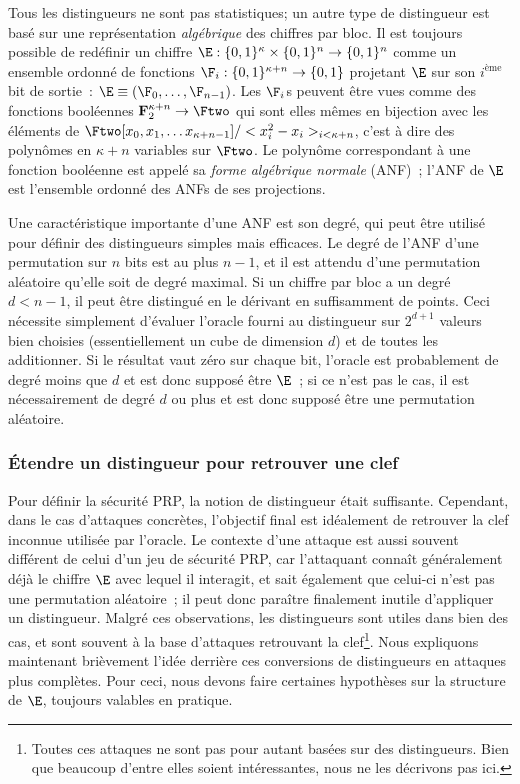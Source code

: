 \bigskip

Tous les distingueurs ne sont pas statistiques;
un autre type de distingueur est basé sur une représentation \emph{algébrique} des chiffres par bloc.
Il est toujours possible de redéfinir un chiffre 
$\E : \{0,1\}^\kappa \times \{0,1\}^n \rightarrow \{0,1\}^n$ comme un ensemble ordonné de fonctions $\F_i : \{0,1\}^{\kappa+n} \rightarrow \{0,1\}$ projetant
$\E$ sur son $i^\text{ème}$ bit de sortie~: $\E \equiv (\F_0, \ldots, \F_{n-1})$. Les $\F_i$s peuvent être vues comme des fonctions booléennes
$\mathbf{F}_{2}^{\kappa + n} \rightarrow \Ftwo$ qui sont elles mêmes en bijection avec les éléments de $\Ftwo[x_0,x_1,\ldots x_{\kappa + n-1}]/<x_i^2-x_i>_{i<\kappa + n}$,
c'est à dire des polynômes en $\kappa + n$ variables sur $\Ftwo$. Le polynôme correspondant à une fonction booléenne est appelé sa \emph{forme algébrique normale}
(ANF)~;
l'ANF de $\E$ est l'ensemble ordonné des ANFs de ses projections.

Une caractéristique importante d'une ANF est son degré, qui peut être utilisé pour définir des distingueurs simples mais efficaces.
Le degré de l'ANF d'une permutation sur $n$ bits est au plus $n - 1$, et il est attendu d'une permutation aléatoire qu'elle soit de degré
maximal. Si un chiffre par bloc a un degré $d < n - 1$, il peut être distingué en le dérivant en suffisamment de points.
Ceci nécessite simplement d'évaluer l'oracle fourni au distingueur sur $2^{d+1}$ valeurs bien choisies (essentiellement un cube de dimension $d$) et de toutes
les additionner.
Si le résultat vaut zéro sur chaque bit, l'oracle est probablement de degré moins que $d$ et est donc supposé être $\E$~; si ce n'est pas le cas, il est
nécessairement de degré $d$ ou plus et est donc supposé être une permutation aléatoire.

\subsubsection{\'Etendre un distingueur pour retrouver une clef}

Pour définir la sécurité PRP, la notion de distingueur était suffisante. Cependant, dans le cas d'attaques concrètes, l'objectif
final est idéalement de retrouver la clef inconnue utilisée par l'oracle.
Le contexte d'une attaque est aussi souvent différent de celui d'un jeu de sécurité PRP, car l'attaquant connaît généralement déjà
le chiffre $\E$ avec lequel il interagit, et sait également que celui-ci n'est pas une permutation aléatoire~; il peut donc paraître finalement inutile
d'appliquer un distingueur.
Malgré ces observations, les distingueurs sont utiles dans bien des cas, et sont souvent à la base d'attaques retrouvant la clef\footnote{Toutes ces
attaques ne sont pas pour autant basées sur des distingueurs. Bien que beaucoup d'entre elles soient intéressantes, nous ne les décrivons pas ici.}.
Nous expliquons maintenant brièvement l'idée derrière ces conversions de distingueurs en attaques plus complètes. Pour ceci, nous devons faire
certaines hypothèses sur la structure de $\E$, toujours valables en pratique.


